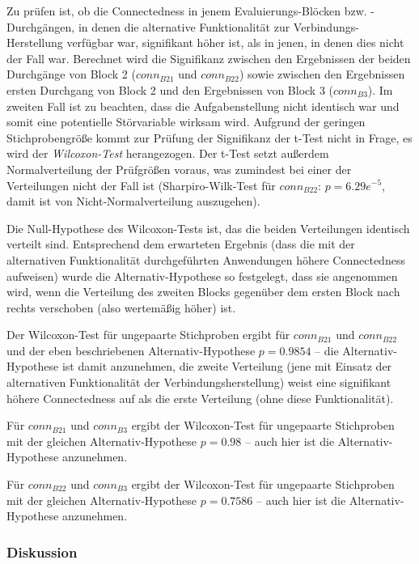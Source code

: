 Zu prüfen ist, ob die Connectedness in jenem Evaluierungs-Blöcken bzw. -Durchgängen, in denen die alternative Funktionalität zur Verbindungs-Herstellung verfügbar war, signifikant höher ist, als in jenen, in denen dies nicht der Fall war. Berechnet wird die Signifikanz zwischen den Ergebnissen der beiden Durchgänge von Block 2 ($conn_{B21}$ und $conn_{B22}$) sowie zwischen den Ergebnissen ersten Durchgang von Block 2 und den Ergebnissen von Block 3 ($conn_{B3}$). Im zweiten Fall ist zu beachten, dass die Aufgabenstellung nicht identisch war und somit eine potentielle Störvariable wirksam wird. Aufgrund der geringen Stichprobengröße kommt zur Prüfung der Signifikanz der t-Test nicht in Frage, es wird der \emph{Wilcoxon-Test} herangezogen. Der t-Test setzt außerdem Normalverteilung der Prüfgrößen voraus, was zumindest bei einer der Verteilungen nicht der Fall ist (Sharpiro-Wilk-Test für $conn_{B22}$: $p=6.29e^{-5}$, damit ist von Nicht-Normalverteilung auszugehen).

Die Null-Hypothese des Wilcoxon-Tests ist, das die beiden Verteilungen identisch verteilt sind. Entsprechend dem erwarteten Ergebnis (dass die mit der alternativen Funktionalität durchgeführten Anwendungen höhere Connectedness aufweisen) wurde die Alternativ-Hypothese so festgelegt, dass sie angenommen wird, wenn die Verteilung des zweiten Blocks gegenüber dem ersten Block nach rechts verschoben (also wertemäßig höher) ist.

Der Wilcoxon-Test für ungepaarte Stichproben ergibt für $conn_{B21}$ und $conn_{B22}$ und der eben beschriebenen Alternativ-Hypothese $p=0.9854$ -- die Alternativ-Hypothese ist damit anzunehmen, die zweite Verteilung (jene mit Einsatz der alternativen Funktionalität der Verbindungsherstellung) weist eine signifikant höhere Connectedness auf als die erste Verteilung (ohne diese Funktionalität). 

Für $conn_{B21}$ und $conn_{B3}$ ergibt der Wilcoxon-Test für ungepaarte Stichproben mit der gleichen Alternativ-Hypothese $p=0.98$ -- auch hier ist die Alternativ-Hypothese anzunehmen.

Für $conn_{B22}$ und $conn_{B3}$ ergibt der Wilcoxon-Test für ungepaarte Stichproben mit der gleichen Alternativ-Hypothese $p=0.7586$ -- auch hier ist die Alternativ-Hypothese anzunehmen.

\subsubsection{Diskussion} %


